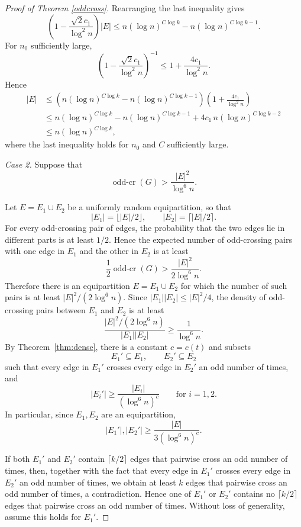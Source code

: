 \documentclass[11pt]{article}
\theoremstyle{plain}
\theoremstyle{definition}
\theoremstyle{remark}
\begin{document}
\begin{proof}[Proof of Theorem \ref{oddcross}]
\noindent Rearranging the last inequality gives
\[
\left(1-\frac{\sqrt{2}c_1}{\log^2 n}\right)|E|
\le n(\log n)^{C\log k}-n(\log n)^{C\log k-1}.
\]
For \(n_0\) sufficiently large,
\[
\left(1-\frac{\sqrt{2}c_1}{\log^2 n}\right)^{-1}
\le 1+\frac{4c_1}{\log^2 n}.
\]
Hence
\[
\begin{aligned}
|E|
&\le
\left(n(\log n)^{C\log k}-n(\log n)^{C\log k-1}\right)
\left(1+\frac{4c_1}{\log^2 n}\right)\\
&\le n(\log n)^{C\log k}
-n(\log n)^{C\log k-1}
+4c_1\,n(\log n)^{C\log k-2}\\
&\le n(\log n)^{C\log k},
\end{aligned}
\]
where the last inequality holds for \(n_0\) and $C$ sufficiently large.



 

\medskip
\noindent \emph{Case 2.} Suppose that
\[
\operatorname{odd\text{-}cr}(G)> \frac{|E|^2}{\log^6 n}.
\]




Let \(E=E_1\cup E_2\) be a uniformly random equipartition, so that
\[
|E_1|=\lfloor |E|/2\rfloor,\qquad |E_2|=\lceil |E|/2\rceil .
\]
For every odd-crossing pair of edges, the probability that the two edges lie
in different parts is at least \(1/2\). Hence the expected number of
odd-crossing pairs with one edge in \(E_1\) and the other in \(E_2\) is at least
\[
\frac{1}{2}\operatorname{odd\text{-}cr}(G)
> \frac{|E|^2}{2\log^6 n}.
\]
Therefore there is an equipartition \(E=E_1\cup E_2\) for which the number of
such pairs is at least \(|E|^2/(2\log^6 n)\). Since $|E_1||E_2|\le |E|^2/4$, the density of odd-crossing pairs between \(E_1\) and \(E_2\) is at least 
\[
\frac{|E|^2/(2\log^6 n)}{|E_1||E_2|}
\ge \frac{1}{\log^6 n}.
\]
By Theorem~\ref{thm:dense}, there is a constant \(c=c(t)\) and subsets
\[
E_1'\subseteq E_1,\qquad E_2'\subseteq E_2
\]
such that every edge in \(E_1'\) crosses every edge in \(E_2'\) an odd number
of times, and
\[
|E_i'|\ge \frac{|E_i|}{(\log^6 n)^c}
\qquad\text{for } i=1,2.
\]
In particular, since \(E_1,E_2\) are an equipartition,
\[
|E_1'|,|E_2'|\ge \frac{|E|}{3(\log^6 n)^c}.
\]

If both \(E_1'\) and \(E_2'\) contain \(\lceil k/2\rceil\) edges that pairwise
cross an odd number of times, then, together with the fact that every edge in
\(E_1'\) crosses every edge in \(E_2'\) an odd number of times, we obtain at
least \(k\) edges that pairwise cross an odd number of times, a contradiction.
Hence one of \(E_1'\) or \(E_2'\) contains no \(\lceil k/2\rceil\) edges that
pairwise cross an odd number of times. Without loss of generality, assume this
holds for \(E_1'\).


\end{proof}
\end{document}
